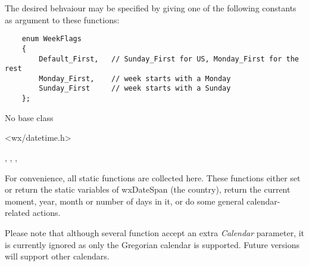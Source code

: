 The desired behvaiour may be specified by giving one of the following
constants as argument to these functions:

\begin{verbatim}
    enum WeekFlags
    {
        Default_First,   // Sunday_First for US, Monday_First for the rest
        Monday_First,    // week starts with a Monday
        Sunday_First     // week starts with a Sunday
    };
\end{verbatim}


No base class


<wx/datetime.h>




,\rtfsp
{},\rtfsp
{},\rtfsp
{}



\label{datetimestaticfunctions}

For convenience, all static functions are collected here. These functions
either set or return the static variables of wxDateSpan (the country), return
the current moment, year, month or number of days in it, or do some general
calendar-related actions.

Please note that although several function accept an extra {\it Calendar}
parameter, it is currently ignored as only the Gregorian calendar is
supported. Future versions will support other calendars.


